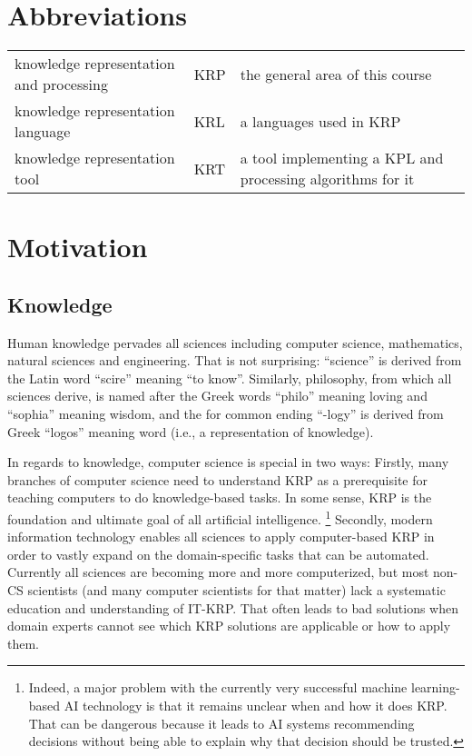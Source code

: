 \section{Abbreviations}

\begin{center}
\begin{tabular}{lll}
knowledge representation and processing & KRP & the general area of this course \\
knowledge representation language & KRL & a languages used in KRP \\
knowledge representation tool & KRT & a tool implementing a KPL and processing algorithms for it
\end{tabular}
\end{center}

\section{Motivation}

\subsection{Knowledge}

Human knowledge pervades all sciences including computer science, mathematics, natural sciences and engineering.
That is not surprising: ``science'' is derived from the Latin word ``scire'' meaning ``to know''.
Similarly, philosophy, from which all sciences derive, is named after the Greek words ``philo'' meaning loving and ``sophia'' meaning wisdom, and the for common ending ``-logy'' is derived from Greek ``logos'' meaning word (i.e., a representation of knowledge).

In regards to knowledge, computer science is special in two ways:
Firstly, many branches of computer science need to understand KRP as a prerequisite for teaching computers to do knowledge-based tasks.
In some sense, KRP is the foundation and ultimate goal of all artificial intelligence.%
\footnote{Indeed, a major problem with the currently very successful machine learning-based AI technology is that it remains unclear when and how it does KRP. That can be dangerous because it leads to AI systems recommending decisions without being able to explain why that decision should be trusted.}
Secondly, modern information technology enables all sciences to apply computer-based KRP in order to vastly expand on the domain-specific tasks that can be automated.
Currently all sciences are becoming more and more computerized, but most non-CS scientists (and many computer scientists for that matter) lack a systematic education and understanding of IT-KRP.
That often leads to bad solutions when domain experts cannot see which KRP solutions are applicable or how to apply them.

